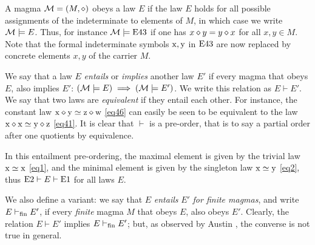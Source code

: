 A magma ${\mathcal{M}} = (M,\diamond)$ obeys a law $E$ if the law $E$ holds for all possible assignments of the indeterminate to elements of $M$, in which case we write ${\mathcal{M}} \models E$. Thus, for instance ${\mathcal{M}} \models \mathrm{E}43$ if one has $x \diamond y = y \diamond x$ for all $x,y \in M$.  Note that the formal indeterminate symbols $\mathrm{x}, \mathrm{y}$ in $\mathrm{E}43$ are now replaced by concrete elements $x,y$ of the carrier $M$.

We say that a law $E$ \emph{entails} or \emph{implies} another law $E'$ if every magma that obeys $E$, also implies $E'$: $({\mathcal{M}} \models E) \implies ({\mathcal{M}} \models E')$.  We write this relation as $E \vdash E'$. We say that two laws are \emph{equivalent} if they entail each other. For instance, the constant law $\mathrm{x} \diamond \mathrm{y} \simeq \mathrm{z} \diamond \mathrm{w}$ \eqref{eq46} can easily be seen to be equivalent to the law $\mathrm{x} \diamond \mathrm{x} \simeq \mathrm{y} \diamond \mathrm{z}$ \eqref{eq41}.  It is clear that $\vdash$ is a pre-order, that is to say a partial order after one quotients by equivalence.

In this entailment pre-ordering, the maximal element is given by the trivial law $\mathrm{x}\simeq\mathrm{x}$ \eqref{eq1}, and the minimal element is given by the singleton law $\mathrm{x}\simeq \mathrm{y}$ \eqref{eq2}, thus $\mathrm{E}2 \vdash E \vdash \mathrm{E}1$ for all laws $E$.

We also define a variant: we say that $E$ \emph{entails} $E'$ \emph{for finite magmas}, and write $E \vdash_{\mathrm{fin}} E'$, if every \emph{finite} magma $M$ that obeys $E$, also obeys $E'$.  Clearly, the relation $E \vdash E'$ implies $E \vdash_{\mathrm{fin}} E'$; but, as observed by Austin \cite{austin_finite}, the converse is not true in general.

